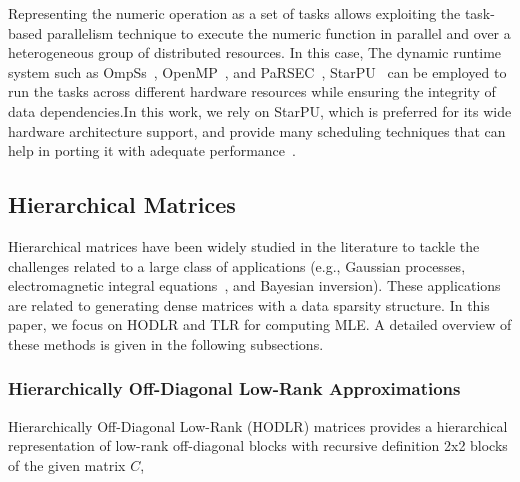\documentclass[conference]{IEEEtran}
\begin{document}
Representing the numeric operation as a set of tasks allows exploiting the task-based parallelism technique to execute the numeric function in parallel and over a heterogeneous group of distributed resources. In this case, 
The dynamic runtime system such as  OmpSs~\cite{duran2011ompss}, OpenMP~\cite{chandra2001parallel},  and PaRSEC~\cite{bosilca2012dague},  StarPU~\cite{augonnet2011starpu} can be employed to run the tasks across different hardware resources while ensuring the integrity of data dependencies.In this work, we rely on StarPU, which is preferred for its wide hardware architecture support, and provide many scheduling techniques that can help in porting it with adequate performance~\cite{tzanos2020applying}.

\subsection{Hierarchical Matrices}

Hierarchical matrices have been widely studied in the literature 
to tackle the challenges related to a large class of applications (e.g., Gaussian processes, electromagnetic 
integral equations~\cite{guo2012hierarchical}, and Bayesian inversion). These applications are related to generating dense matrices 
with a data sparsity structure.
In this paper, we focus on HODLR and TLR for computing MLE. A detailed overview of these
methods is given in the following subsections.


\subsubsection{Hierarchically Off-Diagonal Low-Rank Approximations}

Hierarchically Off-Diagonal Low-Rank (HODLR) matrices provides a hierarchical representation of 
low-rank off-diagonal blocks with recursive 
definition 2x2 blocks of the given matrix $C$,
\end{document}
